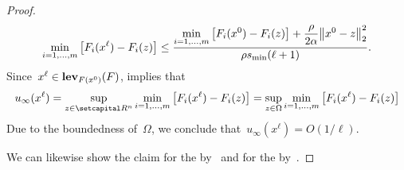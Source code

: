\documentclass[../../main]{subfiles}
\begin{document}
\begin{proof}
    \begin{equation}
        \min_{i = 1, \dots, m} \left[ F_i(x^\ell) - F_i(z) \right] \le \frac{\displaystyle \min_{i = 1, \dots, m} \left[F_i(x^0) - F_i(z)\right] + \frac{\rho}{2 \alpha} \norm*{x^0 - z}_2^2
        }{\rho s_{\min} (\ell + 1)}
        .\end{equation}
    Since~$x^\ell \in \operatorname{\mathbf{lev}}_{F(x^0)}(F)$,  implies that
    \begin{equation}
        u_\infty(x^\ell) = \sup_{z \in \setR^n} \min_{i = 1, \dots, m} \left[ F_i(x^\ell) - F_i(z) \right] = \sup_{z \in \Omega} \min_{i = 1, \dots, m} \left[ F_i(x^\ell) - F_i(z) \right]
    \end{equation}
    Due to the boundedness of~$\Omega$, we conclude that~$u_\infty(x^\ell) = O(1 / \ell)$.

    We can likewise show the claim for the  by~ and for the  by~.
\end{proof}
\end{document}
